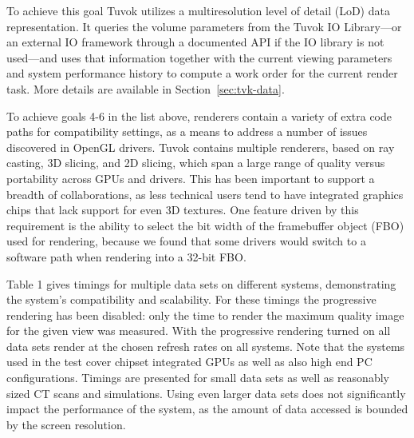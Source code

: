 To achieve this goal Tuvok utilizes a multiresolution level of detail
(LoD) data representation. It queries the volume parameters from the
Tuvok IO Library---or an external IO framework through a documented
API if the IO library is not used---and uses that information together
with the current viewing parameters and system performance history to
compute a work order for the current render task. More
details are available in Section~\ref{sec:tvk-data}.

To achieve goals 4-6 in the list above, renderers contain a variety of
extra code paths for compatibility settings, as a means to address a
number of issues discovered in OpenGL drivers. Tuvok contains multiple
renderers, based on ray casting, 3D slicing, and 2D slicing, which span
a large range of quality versus portability across GPUs and drivers.
This has been important to support a breadth of collaborations, as
less technical users tend to have integrated graphics chips that
lack support for even 3D textures. One feature driven by this
requirement is the ability to select the bit width of the framebuffer
object (FBO) used for rendering, because we found that some drivers
would switch to a software path when rendering into a 32-bit FBO.

Table 1 gives timings for multiple data sets on different
systems, demonstrating the system's compatibility and scalability.
For these timings the progressive rendering has been
disabled: only the time to render the maximum quality
image for the given view was measured. With the progressive
rendering turned on all data sets render at the chosen refresh
rates on all systems. Note that the systems used in the test
cover chipset integrated GPUs as well as also high end PC
configurations. Timings are presented for small data sets as
well as reasonably sized CT scans and simulations. Using
even larger data sets does not significantly impact the
performance of the system, as the amount of data accessed is
bounded by the screen resolution.

